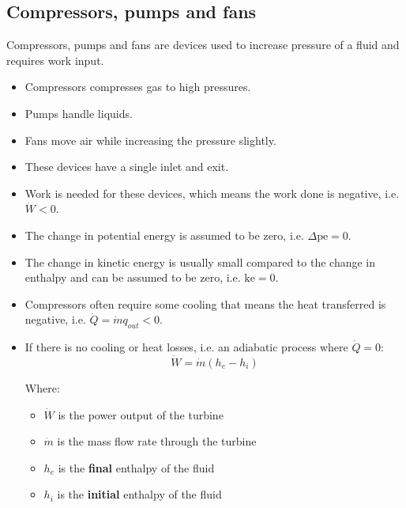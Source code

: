 \documentclass[11pt]{article}
\begin{document}
\newpage

\subsection{Compressors, pumps and fans}
\label{sec:org6d377f8}
Compressors, pumps and fans are devices used to increase pressure of a fluid and requires work input.
\begin{itemize}
\item Compressors compresses gas to high pressures.
\item Pumps handle liquids.
\item Fans move air while increasing the pressure slightly.
\item These devices have a single inlet and exit.
\item Work is needed for these devices, which means the work done is negative, i.e. \(\dot{W} < 0\).
\item The change in potential energy is assumed to be zero, i.e. \(\Delta \text{pe} = 0\).
\item The change in kinetic energy is usually small compared to the change in enthalpy and can be assumed to be zero, i.e. \(\text{ke} = 0\).
\item Compressors often require some cooling that means the heat transferred is negative, i.e. \(\dot{Q} = \dot{m} q_{out} < 0\).
\item If there is no cooling or heat losses, i.e. an adiabatic process where \(\dot{Q} = 0\):
\[\dot{W} = \dot{m} \left(h_e - h_i \right)\]

Where:
\begin{itemize}
\item \(\dot{W}\) is the power output of the turbine
\item \(\dot{m}\) is the mass flow rate through the turbine
\item \(h_e\) is the \textbf{final} enthalpy of the fluid
\item \(h_i\) is the \textbf{initial} enthalpy of the fluid
\end{itemize}
\end{itemize}

\newpage
\end{document}
